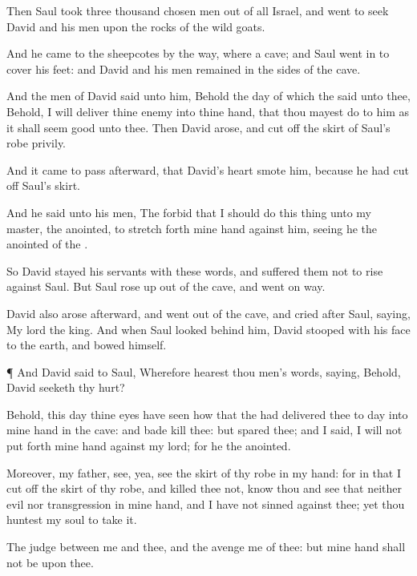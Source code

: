 {Then
Saul
took
three
thousand
chosen
men out of all
Israel, and
went to
seek
David and his
men
upon the
rocks of the wild
goats.

And he
came to the
sheepcotes by the
way, where
{} a
cave; and
Saul went
in to
cover his
feet: and
David and his
men
remained in the
sides of the
cave.

And the
men of
David
said unto him, Behold the
day of which the
{}
said unto thee, Behold, I will
deliver thine
enemy into thine
hand, that thou mayest
do to him as it shall seem
good unto
thee. Then
David
arose, and cut
off the
skirt of
Saul’s
robe
privily.

And it came to pass
afterward, that
David’s
heart
smote him, because he had cut
off
Saul’s
skirt.

And he
said unto his
men, The
{}
forbid that I should
do this
thing unto my
master, the
{}
anointed, to stretch
forth mine
hand against him, seeing he
{} the
anointed of the
{}.

So
David
stayed his
servants with these
words, and
suffered them not to
rise against
Saul. But
Saul rose
up out of the
cave, and
went on
{}
way.

David also
arose afterward, and went
out of the
cave, and
cried
after
Saul,
saying, My
lord the
king. And when
Saul
looked
behind him,
David
stooped with his
face to the
earth, and
bowed himself.


\par }{\PP {}¶ And
David
said to
Saul, Wherefore
hearest thou
men’s
words,
saying, Behold,
David
seeketh thy
hurt?

Behold, this
day thine
eyes have
seen how that the
{} had
delivered thee to
day into mine
hand in the
cave: and
{}
bade
{}
kill thee: but
{}
spared thee; and I
said, I will not put
forth mine
hand against my
lord; for he
{} the
{}
anointed.

Moreover, my
father,
see, yea,
see the
skirt of thy
robe in my
hand: for in that I cut
off the
skirt of thy
robe, and
killed thee not,
know thou and
see that
{} neither
evil nor
transgression in mine
hand, and I have not
sinned against thee; yet thou
huntest my
soul to
take it.

The
{}
judge between me and thee, and the
{}
avenge me of thee: but mine
hand shall not be upon thee.

}
